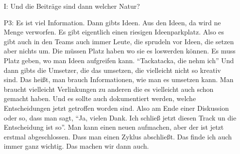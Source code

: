 \begin{itemize}
    \item[I:] Und die Beitr{\"a}ge sind dann welcher Natur?
    \item[P3:] Es ist viel Information. Dann gibts Ideen. Aus den Ideen, da wird ne Menge verworfen. Es gibt eigentlich einen riesigen Ideenparkplatz. Also es gibt auch in den Teams auch immer Leute, die sprudeln vor Ideen, die setzen aber nichts um. Die m{\"u}ssen Platz haben wo sie es loswerden k{\"o}nnen. Es muss Platz geben, wo man Ideen aufgreifen kann. "`Tackatacka, die nehm ich"' Und dann gibts die Umsetzer, die das umsetzen, die vielleicht nicht so kreativ sind. Das hei{\ss}t, man brauch Informationen, wie man es umsetzen kann. Man braucht vielleicht Verlinkungen zu anderen die es vielleicht auch schon gemacht haben. Und es sollte auch dokumentiert werden, welche Entscheidungen jetzt getroffen worden sind. Also am Ende einer Diskussion oder so, dass man sagt, "`Ja, vielen Dank. Ich schlie{\ss} jetzt diesen Track un die Entscheidung ist so"'. Man kann einen neuen aufmachen, aber der ist jetzt erstmal abgeschlossen. Dass man einen Zyklus abschlie{\ss}t. Das finde ich auch immer ganz wichtig. Das machen wir dann auch.
\end{itemize}

